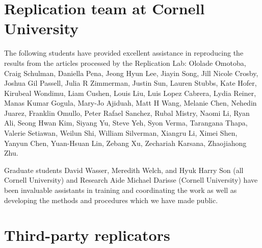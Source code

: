 \documentclass[PP]{AEA}
\begin{document}
\section{Replication team at Cornell University}
\label{app:replicators}

The following students have provided excellent assistance in reproducing the results from the \jiramcs{} articles processed by the Replication Lab:
%
%
Ololade Omotoba,
Craig  Schulman,
Daniella Pena,
Jeong Hyun Lee,
Jiayin Song,
Jill Nicole Crosby,
Joshua Gil Passell,
Julia R Zimmerman,
Justin Sun,
Lauren  Stubbs,
Kate  Hofer,
Kirubeal  Wondimu,
Liam Cushen,
Louis Liu,
Luis  Lopez Cabrera,
Lydia Reiner,
Manas Kumar Gogula,
Mary-Jo  Ajiduah,
Matt H Wang,
Melanie Chen,
Nehedin  Juarez,
Franklin Omullo,
Peter Rafael Sanchez,
Rubal Mistry,
Naomi  Li,
Ryan Ali,
Seong Hwan Kim,
Siyang Yu,
Steve Yeh,
Syon Verma,
Tarangana Thapa,
Valerie  Setiawan,
Weilun Shi,
William  Silverman,
Xiangru Li,
Ximei Shen,
Yanyun Chen,
Yuan-Hsuan Lin,
Zebang Xu,
Zechariah  Karsana,
Zhaojiahong Zhu.


Graduate students David Wasser, Meredith Welch, and Hyuk Harry Son (all Cornell University) and Research Aide Michael Darisse (Cornell University) have been invaluable assistants in training and coordinating the work as well as developing the methods and procedures which we have made public. 

\section{Third-party replicators}
\label{app:3rdparty}
\end{document}
